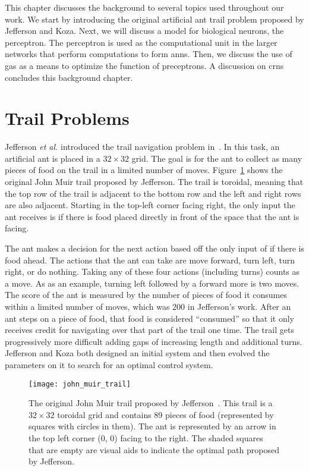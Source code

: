 \def\layerseptikznn{2.5cm}

This chapter discusses the background to several topics used throughout our work. We start by introducing the original artificial ant trail problem proposed by Jefferson and Koza. Next, we will discuss a model for biological neurons, the perceptron. The perceptron is used as the computational unit in the larger networks that perform computations to form \glspl{ann}. Then, we discuss the use of \glspl{ga} as a means to optimize the function of preceptrons.  A discussion on \glspl{crn} concludes this background chapter.

\section{Trail Problems}
\label{sec:trail_problems_bg}
Jefferson \textit{et al.} introduced the trail navigation problem in~\cite{Jefferson1992-ph}. In this task, an artificial ant is placed in a $32 \times 32$ grid. The goal is for the ant to collect as many pieces of food on the trail in a limited number of moves. Figure~\ref{fig:johnmuirtrailimage} shows the original John Muir trail proposed by Jefferson. The trail is toroidal, meaning that the top row of the trail is adjacent to the bottom row and the left and right rows are also adjacent. Starting in the top-left corner facing right, the only input the ant receives is if there is food placed directly in front of the space that the ant is facing.

The ant makes a decision for the next action based off the only input of if there is food ahead. The actions that the ant can take are move forward, turn left, turn right, or do nothing. Taking any of these four actions (including turns) counts as a move. As as an example, turning left followed by a forward more is two moves. The score of the ant is measured by the number of pieces of food it consumes within a limited number of moves, which was 200 in Jefferson's work. After an ant steps on a piece of food, that food is considered ``consumed'' so that it only receives credit for navigating over that part of the trail one time. The trail gets progressively more difficult adding gaps of increasing length and additional turns. Jefferson and Koza both designed an initial system and then evolved the parameters on it to search for an optimal control system.

\begin{figure}[tbp]
\centering
\texttt{[image: john\_muir\_trail]}
\caption[John Muir Trail]{The original John Muir trail proposed by Jefferson~\cite{Jefferson1992-ph}. This trail is a $32 \times 32$ toroidal grid and contains 89 pieces of food (represented by squares with circles in them). The ant is represented by an arrow in the top left corner (0, 0) facing to the right. The shaded squares that are empty are visual aids to indicate the optimal path proposed by Jefferson.}
\label{fig:johnmuirtrailimage}
\end{figure}

